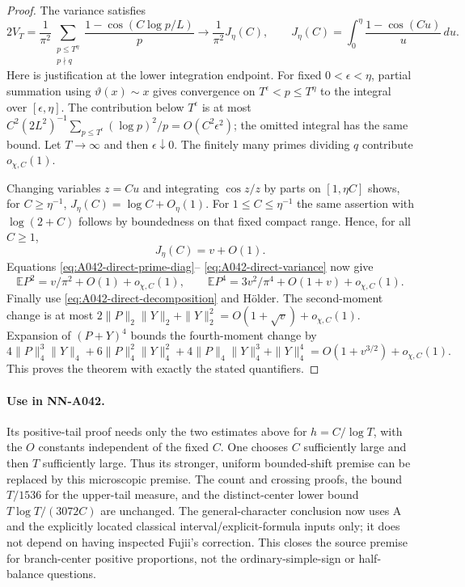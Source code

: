 \begin{proof}
The variance satisfies
\begin{equation}\label{eq:A042-direct-variance}
 2V_T=\frac1{\pi^2}
   \sum_{\substack{p\le T^\eta\\p\nmid q}}
       \frac{1-\cos(C\log p/L)}p
 \longrightarrow\frac1{\pi^2}
      J_\eta(C),\qquad
 J_\eta(C)=\int_0^\eta\frac{1-\cos(Cu)}u\,du.
\end{equation}
Here is justification at the lower integration endpoint.
For fixed $0<\epsilon<\eta$, partial summation using
$\vartheta(x)\sim x$ gives convergence on
$T^\epsilon<p\le T^\eta$ to the integral over
$[\epsilon,\eta]$. The contribution below $T^\epsilon$
is at most
$C^2(2L^2)^{-1}\sum_{p\le T^\epsilon}(\log p)^2/p
=O(C^2\epsilon^2)$; the omitted integral has the same bound.
Let $T\to\infty$ and then $\epsilon\downarrow0$.
The finitely many primes dividing $q$ contribute $o_{\chi,C}(1)$.

Changing variables $z=Cu$ and integrating $\cos z/z$ by
parts on $[1,\eta C]$ shows, for $C\ge\eta^{-1}$,
$J_\eta(C)=\log C+O_\eta(1)$.
For $1\le C\le\eta^{-1}$ the same assertion with
$\log(2+C)$ follows by boundedness on that fixed compact
range. Hence, for all $C\ge1$,
\[
                         J_\eta(C)=v+O(1).
\]
Equations \eqref{eq:A042-direct-prime-diag}--
\eqref{eq:A042-direct-variance} now give
\[
 \mathbb EP^2=v/\pi^2+O(1)+o_{\chi,C}(1),\qquad
 \mathbb EP^4=3v^2/\pi^4+O(1+v)+o_{\chi,C}(1).
\]
Finally use \eqref{eq:A042-direct-decomposition} and H\"older.
The second-moment change is at most
$2\|P\|_2\|Y\|_2+\|Y\|_2^2=O(1+\sqrt v)+o_{\chi,C}(1)$.
Expansion of $(P+Y)^4$ bounds the fourth-moment change by
\[
 4\|P\|_4^3\|Y\|_4+6\|P\|_4^2\|Y\|_4^2
       +4\|P\|_4\|Y\|_4^3+\|Y\|_4^4
       =O(1+v^{3/2})+o_{\chi,C}(1).
\]
This proves the theorem with exactly the stated quantifiers.
\end{proof}

\paragraph{Use in NN-A042.}
Its positive-tail proof needs only the two estimates above for
$h=C/\log T$, with the $O$ constants independent of the fixed
$C$. One chooses $C$ sufficiently large and then $T$ sufficiently
large. Thus its stronger, uniform bounded-shift premise can be
replaced by this microscopic premise. The count and crossing
proofs, the bound $T/1536$ for the upper-tail measure, and the
distinct-center lower bound $T\log T/(3072C)$ are unchanged.
The general-character conclusion now uses A and the explicitly
located classical interval/explicit-formula inputs only; it does
not depend on having inspected Fujii's correction. This closes
the source premise for branch-center positive proportions, not
the ordinary-simple-sign or half-balance questions.


